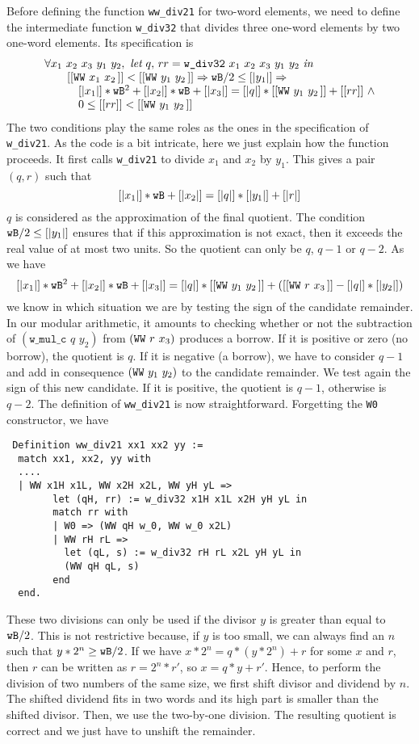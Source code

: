 Before defining the function {\tt ww\_div21} for two-word elements,
we need to define the intermediate function  {\tt w\_div32}
that divides three one-word elements by two one-word elements.
Its specification is
$$\begin{array}{l}
\forall x_1\,\, x_2\,\, x_3\,\, y_1\,\, y_2, \,\, \textit{let}\,\, q,\, rr = 
\texttt{w\_div32}\,\, x_1\,\, x_2\,\, x_3\,\, y_1\,\, y_2\,\, \textit{in}\\
 \hskip20pt [[\texttt{WW}\,\,x_1\,\,x_2\,]] < [[\texttt{WW}\,\,y_1\,\,y_2\,]] \Rightarrow 
 {\texttt{wB}} / 2 \le [|y_1|] \Rightarrow\\
 \hskip30pt [|x_1|] * {\texttt{wB}} ^ 2 + [|x_2|] * {\texttt{wB}}  + [|x_3|] =   [|q|] *  
 [[\texttt{WW}\,\,y_1\,\,y_2\,]] + [[rr]] \,\,\land  \\
 \hskip30pt 0 \le [[rr]] < [[\texttt{WW}\,\,y_1\,\,y_2\,]]
\end{array}
$$
The two conditions play the same roles as the ones in the specification of {\tt w\_div21}.
As the code is a bit intricate, here we just explain how the function
proceeds. It first calls {\tt w\_div21} to divide $x_1$ and $x_2$
by $y_1$. This gives a pair $(q,r)$ such that
$$[|x_1|] * {\texttt{wB}} + [|x_2|] = [|q|] * [|y_1|] + [|r|]$$
$q$ is considered as the approximation of the final quotient.
The condition ${\texttt{wB}} / 2 \le [|y_1|]$ ensures that if this approximation
is not exact, then it exceeds the real value of at most two units. So the quotient 
can only be $q$, $q - 1$ or $q - 2$. 
As we have 
$$[|x_1|] *  {\texttt{wB}} ^ 2  + [|x_2|] * {\texttt{wB}} + [|x_3|] = [|q|] * [[\texttt{WW}\,\,y_1\,\,y_2\,]] + ([[\texttt{WW}\,\,r\,\,x_3\,]] - [|q|] * [|y_2|])$$
we know in which situation we are by testing the sign of the candidate
remainder.
In our modular arithmetic, it amounts to checking whether or not the subtraction of
$(\texttt{w\_mul\_c}\,\, q\,\, y_2)$ from $(\texttt{WW}\,\,r\,\,x_3\,\!)$
produces a borrow.  
If it is positive or zero (no borrow), the quotient is $q$. 
If it is negative (a borrow), 
we have to consider $q - 1$ and add in consequence $(\texttt{WW}\,\,y_1\,\,y_2\,\!)$ 
to the candidate remainder.
We test again the sign of this new candidate. 
If it is positive, the quotient is $q - 1$,
otherwise is $q - 2$.
The definition of {\tt ww\_div21} is now straightforward. 
Forgetting the {\tt W0}
constructor, we have
\begin{verbatim} 
 Definition ww_div21 xx1 xx2 yy :=
  match xx1, xx2, yy with
  ....  
  | WW x1H x1L, WW x2H x2L, WW yH yL =>
        let (qH, rr) := w_div32 x1H x1L x2H yH yL in
        match rr with
        | W0 => (WW qH w_0, WW w_0 x2L)
        | WW rH rL =>
          let (qL, s) := w_div32 rH rL x2L yH yL in
          (WW qH qL, s)
        end
  end.
\end{verbatim}
These two divisions can only be used if the divisor $y$ is greater than equal
to ${\texttt{wB}}/2$.
This is not restrictive
because, if $y$ is too small, we can always find an $n$ such that 
$y* 2 ^n \ge {\texttt{wB}}/2$. If we have $x * 2 ^ n  =  q  * (y * 2 ^ n) + r$ 
for some $x$ and $r$, then $r$ can be written as $r = 2^n * r'$, so
$x = q * y + r'$. Hence, to perform the division of two numbers of the same size, 
we first shift divisor and dividend by $n$. 
The shifted dividend fits in two words and its high part is smaller
than the shifted divisor. Then, we use the two-by-one division. 
The resulting quotient is correct and we just have to unshift the remainder.

